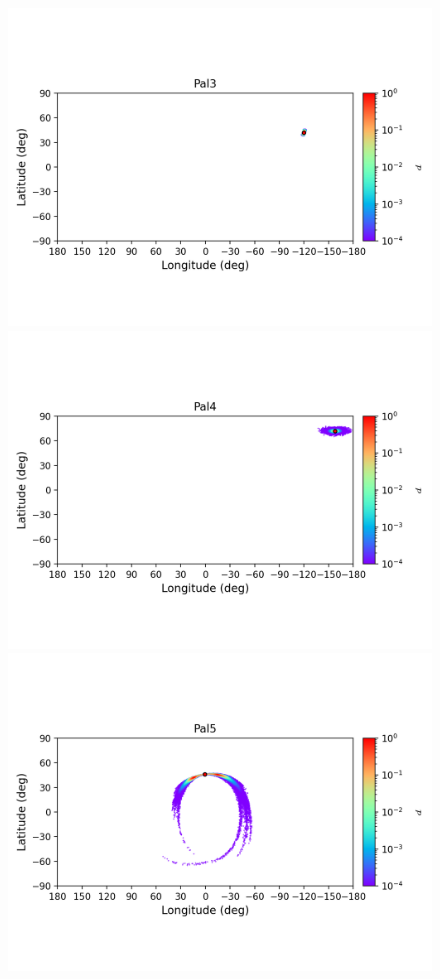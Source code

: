         \begin{figure}
        \includegraphics[clip=true, trim = 0mm 20mm 0mm 10mm, width=1\columnwidth]{images/error_plots_Pal3.png}
        \includegraphics[clip=true, trim = 0mm 20mm 0mm 10mm, width=1\columnwidth]{images/error_plots_Pal4.png}
        \includegraphics[clip=true, trim = 0mm 20mm 0mm 10mm, width=1\columnwidth]{images/error_plots_Pal5.png}

\end{figure}
